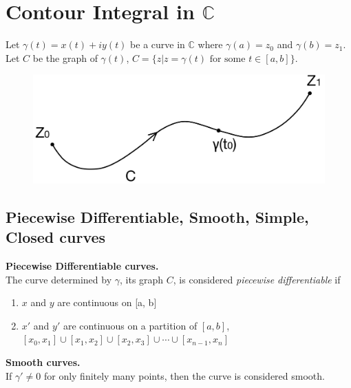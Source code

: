 \documentclass[11pt]{article}
\begin{document}
\newpage
\section{Contour Integral in $\mathbb{C}$}
Let $\gamma(t) = x(t) + iy(t)$ be a curve in $\mathbb{C}$ where $\gamma(a) = z_0$ and $\gamma(b) = z_1$. \\
Let $C$ be the graph of $\gamma(t)$, $C = \{z | z = \gamma(t) \mbox{ for some } t \in [a, b] \}$. 
\begin{figure}[H]
\includegraphics[scale = 0.2]{11_1}
\centering
\end{figure}
\subsection{Piecewise Differentiable, Smooth, Simple, Closed curves}
\textbf{Piecewise Differentiable curves.} \\
The curve determined by $\gamma$, its graph $C$, is considered \textit{piecewise differentiable} if 
\begin{enumerate}[leftmargin = *, nolistsep]
\item $x$ and $y$ are continuous on [a, b]
\item $x'$ and $y'$ are continuous on a partition of $[a, b]$, $[x_0, x_1] \cup [x_1, x_2] \cup [x_2, x_3] \cup \cdots \cup [x_{n - 1}, x_n]$ \\
\end{enumerate} 
\textbf{Smooth curves.} \\
If $\gamma' \neq 0$ for only finitely many points, then the curve is considered smooth. \\
\end{document}
